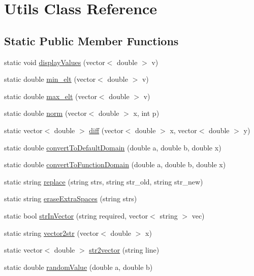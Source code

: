 \hypertarget{class_utils}{}\section{Utils Class Reference}
\label{class_utils}
\subsection*{Static Public Member Functions}
\begin{DoxyCompactItemize}
\item 
static void \hyperlink{class_utils_a02acfe9933a883a961f630cc60119daf}{display\+Values} (vector$<$ double $>$ v)
\item 
static double \hyperlink{class_utils_a3577821d384644fd163c2a83f47f03be}{min\+\_\+elt} (vector$<$ double $>$ v)
\item 
static double \hyperlink{class_utils_aa8f2a368c1da46a3798c45319958b67b}{max\+\_\+elt} (vector$<$ double $>$ v)
\item 
static double \hyperlink{class_utils_ab4db8a1cd94a91dd853c73696bb3ad67}{norm} (vector$<$ double $>$ x, int p)
\item 
static vector$<$ double $>$ \hyperlink{class_utils_ac229b7e4ffd41b36a272f35574e59a66}{diff} (vector$<$ double $>$ x, vector$<$ double $>$ y)
\item 
static double \hyperlink{class_utils_afac41428c306c6e26ce25831a94d2963}{convert\+To\+Default\+Domain} (double a, double b, double x)
\item 
static double \hyperlink{class_utils_a0e31da1f70e01bd5cc7b0edba2d38983}{convert\+To\+Function\+Domain} (double a, double b, double x)
\item 
static string \hyperlink{class_utils_a8a82a7ffe053f980c13d8dea64080ab9}{replace} (string strs, string str\+\_\+old, string str\+\_\+new)
\item 
static string \hyperlink{class_utils_a5014b4a0129213a5d596a0a287367d05}{erase\+Extra\+Spaces} (string strs)
\item 
static bool \hyperlink{class_utils_a088cf62d3a33c3f6836e9b6180a614be}{str\+In\+Vector} (string required, vector$<$ string $>$ vec)
\item 
static string \hyperlink{class_utils_a7a7b3dad14586624387060e0f7074b0c}{vector2str} (vector$<$ double $>$ x)
\item 
static vector$<$ double $>$ \hyperlink{class_utils_abac389cfb698e079e4674ccf1491720a}{str2vector} (string line)
\item 
static double \hyperlink{class_utils_ad3885d38d14f470daa040fb0abbad39f}{random\+Value} (double a, double b)

\end{DoxyCompactItemize}
